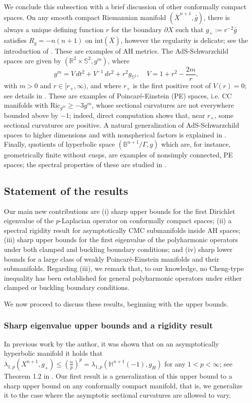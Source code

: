 \documentclass{amsart}
\newcommand{\Ric}{\text{Ric}}
\newcommand{\Hyp}{\mathbb{H}^{n+1}(-1)}
\begin{document}
We conclude this subsection with a brief discussion of other conformally compact spaces. On any smooth compact Riemannian manifold $(\overline{X}^{n+1}, \bar g)$, there is always a unique defining function $r$ for the boundary $\partial X$ such that $g_+:=r^{-2}\bar g$ satisfies $R_g = -n(n+1)$ on $\text{int}(\overline X)$, however the regularity is delicate; see the introduction of \cite{GrahamC.Robin2017Vrfs}. These are examples of AH metrics. The AdS-Schwarzchild spaces are given by $(\mathbb{R}^2\times \mathbb{S}^2,g^m)$, where 
\[
g^m = V\,dt^2 + V^{-1}\,dr^2 + r^2 g_{\mathbb{S}^2}, \quad 
V = 1 + r^2 - \frac{2m}{r},
\]
with $m>0$ and $r\in [r_+,\infty)$, and where $r_+$ is the first positive root of $V(r) = 0$; see details in \cite{ChangSun-YungA.2007SPiC}. These are examples of Poincar\'e-Einstein (PE) spaces, i.e. CC manifolds with $\Ric_{g^m}\ge -3g^m$, whose sectional curvatures are not everywhere bounded above by $-1$; indeed, direct computation shows that, near $r_+$, some sectional curvatures are positive. A natural generalization of AdS-Schwarzchild spaces to higher dimensions and with nonspherical factors is explained in \cite{Anderson:2004yi}. Finally, quotients of hyperbolic space $(\mathbb{B}^{n+1}/\Gamma,g)$ which are, for instance, geometrically finite without cusps, are examples of nonsimply connected, PE spaces; the spectral properties of these are studied in \cite{SullivanDennis1987Raop}.


\subsection{Statement of the results}\label{DefinitionsStatements} 
Our main new contributions are (i) sharp upper bounds for the first Dirichlet eigenvalue of the $p$-Laplacian operator on conformally compact spaces; (ii)  a spectral rigidity result for asymptotically CMC submanifolds inside AH spaces; (iii) sharp upper bounds for the first eigenvalue of the polyharmonic operators under both clamped and buckling boundary conditions; and (iv) sharp lower bounds for a large class of weakly Poincar\'e-Einstein manifolds and their submanifolds. Regarding (iii), we remark that, to our knowledge, no Cheng-type inequality has been established for general polyharmonic operators under either clamped or buckling boundary conditions.

We now proceed to discuss these results, beginning with the upper bounds.

\subsubsection{Sharp eigenvalue upper bounds and a rigidity result}
In previous work by the author, it was shown that on an asymptotically hyperbolic manifold it holds that $\lambda_{1,p}(X^{n+1},g_+)\le \left(\frac{n}{p}\right)^p = \lambda_{1,p}(\Hyp,g_H)$ for any $1<p<\infty$; see Theorem 1.2 in \cite{PerezAyalaTyrrell}. Our first result is a generalization of this upper bound to a sharp upper bound on any conformally compact manifold, that is, we generalize it to the case where the asymptotic sectional curvatures are allowed to vary.
\end{document}
